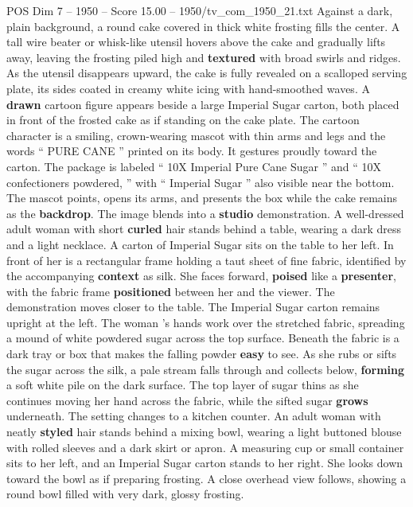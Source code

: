\begin{textsample}{POS Dim 7 – 1950 – Score 15.00 – 1950/tv\_com\_1950\_21.txt}  \label{ex:f7_pos_015}
Against a dark, plain background, a round cake covered in thick white frosting fills the center.
A tall wire beater or whisk-like utensil hovers above the cake and gradually lifts away, leaving the frosting piled high and \textbf{textured} with broad swirls and ridges.
As the utensil disappears upward, the cake is fully revealed on a scalloped serving plate, its sides coated in creamy white icing with hand-smoothed waves.
A \textbf{drawn} cartoon figure appears beside a large Imperial Sugar carton, both placed in front of the frosted cake as if standing on the cake plate.
The cartoon character is a smiling, crown-wearing mascot with thin arms and legs and the words “ PURE CANE ” printed on its body.
It gestures proudly toward the carton.
The package is labeled “ 10X Imperial Pure Cane Sugar ” and “ 10X confectioners powdered, ” with “ Imperial Sugar ” also visible near the bottom.
The mascot points, opens its arms, and presents the box while the cake remains as the \textbf{backdrop}.
The image blends into a \textbf{studio} demonstration.
A well-dressed adult woman with short \textbf{curled} hair stands behind a table, wearing a dark dress and a light necklace.
A carton of Imperial Sugar sits on the table to her left.
In front of her is a rectangular frame holding a taut sheet of fine fabric, identified by the accompanying \textbf{context} as silk.
She faces forward, \textbf{poised} like a \textbf{presenter}, with the fabric frame \textbf{positioned} between her and the viewer.
The demonstration moves closer to the table.
The Imperial Sugar carton remains upright at the left.
The woman ’s hands work over the stretched fabric, spreading a mound of white powdered sugar across the top surface.
Beneath the fabric is a dark tray or box that makes the falling powder \textbf{easy} to see.
As she rubs or sifts the sugar across the silk, a pale stream falls through and collects below, \textbf{forming} a soft white pile on the dark surface.
The top layer of sugar thins as she continues moving her hand across the fabric, while the sifted sugar \textbf{grows} underneath.
The setting changes to a kitchen counter.
An adult woman with neatly \textbf{styled} hair stands behind a mixing bowl, wearing a light buttoned blouse with rolled sleeves and a dark skirt or apron.
A measuring cup or small container sits to her left, and an Imperial Sugar carton stands to her right.
She looks down toward the bowl as if preparing frosting.
A close overhead view follows, showing a round bowl filled with very dark, glossy frosting.

\end{textsample}

